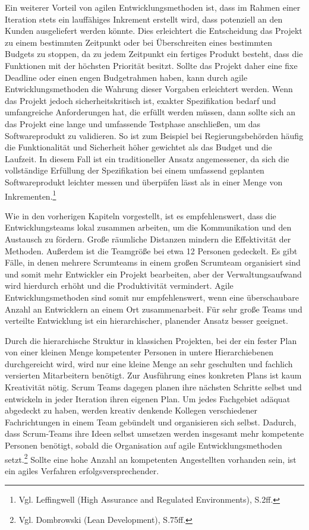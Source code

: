         Ein weiterer Vorteil von agilen Entwicklungsmethoden ist, dass im Rahmen einer Iteration stets ein lauffähiges Inkrement erstellt wird, dass potenziell an den Kunden ausgeliefert werden könnte. Dies erleichtert die Entscheidung das Projekt zu einem bestimmten Zeitpunkt oder bei Überschreiten eines bestimmten Budgets zu stoppen, da zu jedem Zeitpunkt ein fertiges Produkt besteht, dass die Funktionen mit der höchsten Priorität besitzt. Sollte das Projekt daher eine fixe Deadline oder einen engen Budgetrahmen haben, kann durch agile Entwicklungsmethoden die Wahrung dieser Vorgaben erleichtert werden.
        Wenn das Projekt jedoch sicherheitskritisch ist, exakter Spezifikation bedarf und umfangreiche Anforderungen hat, die erfüllt werden müssen, dann sollte sich an das Projekt eine lange und umfassende Testphase anschließen, um das Softwareprodukt zu validieren. So ist zum Beispiel bei Regierungsbehörden häufig die Funktionalität und Sicherheit höher gewichtet als das Budget und die Laufzeit. In diesem Fall ist ein traditioneller Ansatz angemessener, da sich die vollständige Erfüllung der Spezifikation bei einem umfassend geplanten Softwareprodukt leichter messen und überpüfen lässt als in einer Menge von Inkrementen.\footnote{Vgl. Leffingwell (High Assurance and Regulated Environments), S.2ff.}

        Wie in den vorherigen Kapiteln vorgestellt, ist es empfehlenswert, dass die Entwicklungsteams lokal zusammen arbeiten, um die Kommunikation und den Austausch zu fördern. Große räumliche Distanzen mindern die Effektivität der Methoden. Außerdem ist die Teamgröße bei etwa 12 Personen gedeckelt. Es gibt Fälle, in denen mehrere Scrumteams in einem großen Scrumteam organisiert sind und somit mehr Entwickler ein Projekt bearbeiten, aber der Verwaltungsaufwand wird hierdurch erhöht und die Produktivität vermindert. Agile Entwicklungsmethoden sind somit nur empfehlenswert, wenn eine überschaubare Anzahl an Entwicklern an einem Ort zusammenarbeit.
        Für sehr große Teams und verteilte Entwicklung ist ein hierarchischer, planender Ansatz besser geeignet.

        Durch die hierarchische Struktur in klassichen Projekten, bei der ein fester Plan von einer kleinen Menge kompetenter Personen in untere Hierarchiebenen durchgereicht wird, wird nur eine kleine Menge an sehr geschulten und fachlich versierten Mitarbeitern benötigt. Zur Ausführung eines konkreten Plans ist kaum Kreativität nötig. Scrum Teams dagegen planen ihre nächsten Schritte selbst und entwickeln in jeder Iteration ihren eigenen Plan. Um jedes Fachgebiet adäquat abgedeckt zu haben, werden kreativ denkende Kollegen verschiedener Fachrichtungen in einem Team gebündelt und organisieren sich selbst. Dadurch, dass Scrum-Teams ihre Ideen selbst umsetzen werden insgesamt mehr kompetente Personen benötigt, sobald die Organisation auf agile Entwicklungsmethoden setzt.\footnote{Vgl. Dombrowski (Lean Development), S.75ff.}
        Sollte eine hohe Anzahl an kompetenten Angestellten vorhanden sein, ist ein agiles Verfahren erfolgsversprechender.


